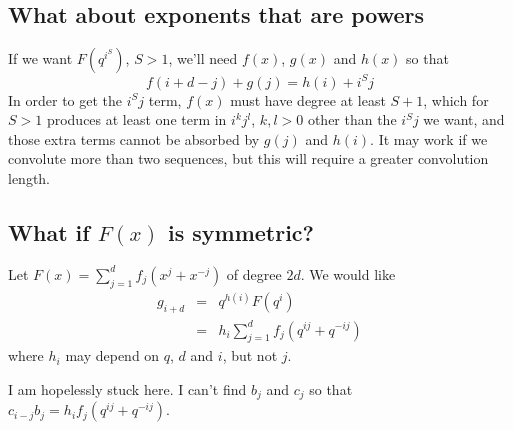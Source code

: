 \documentclass{article}
\begin{document}
\subsection{What about exponents that are powers}
If we want $F(q^{i^S})$, $S>1$, we'll need $f(x)$, $g(x)$ and $h(x)$ so that
\begin{displaymath}
  f(i+d-j) + g(j) = h(i) + i^{S}j
\end{displaymath}
In order to get the $i^{S}j$ term, $f(x)$ must have degree at least $S+1$, 
which for $S>1$ produces at least one term in $i^k j^l$, $k,l>0$ other
than the $i^{S}j$ we want, and those extra terms cannot be absorbed by $g(j)$ 
and $h(i)$. It may work if we convolute more than two sequences, 
but this will require a greater convolution length.

\subsection{What if $F(x)$ is symmetric?}
Let $F(x) = \sum_{j=1}^{d} f_j (x^j + x^{-j})$ of degree $2d$.
We would like
\begin{eqnarray*}
g_{i+d} & = & q^{h(i)} F(q^i) \\
 & = & h_i \sum_{j=1}^{d} f_j \left(q^{ij} + q^{-ij} \right) 
\end{eqnarray*}
where $h_i$ may depend on $q$, $d$ and $i$, but not $j$.

I am hopelessly stuck here. I can't find $b_j$ and $c_j$ so that 
$c_{i-j}b_j = h_i f_j \left(q^{ij} + q^{-ij} \right)$.
\end{document}
